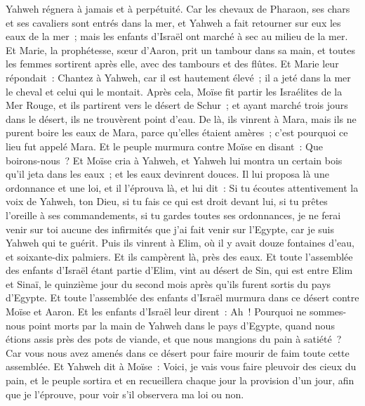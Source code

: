 \begin{multicols}{2}
Yahweh régnera à jamais et à perpétuité.
Car les chevaux de Pharaon, ses chars et ses cavaliers sont entrés dans la mer, et Yahweh a fait retourner sur eux les eaux de la mer~; mais les enfants d'Israël ont marché à sec au milieu de la mer.
Et Marie, la prophétesse, sœur d'Aaron, prit un tambour dans sa main, et toutes les femmes sortirent après elle, avec des tambours et des flûtes.
Et Marie leur répondait~: Chantez à Yahweh, car il est hautement élevé~; il a jeté dans la mer le cheval et celui qui le montait.
Après cela, Moïse fit partir les Israélites de la Mer Rouge, et ils partirent vers le désert de Schur~; et ayant marché trois jours dans le désert, ils ne trouvèrent point d'eau.
De là, ils vinrent à Mara, mais ils ne purent boire les eaux de Mara, parce qu'elles étaient amères~; c'est pourquoi ce lieu fut appelé Mara.
Et le peuple murmura contre Moïse en disant~: Que boirons-nous~?
Et Moïse cria à Yahweh, et Yahweh lui montra un certain bois qu'il jeta dans les eaux~; et les eaux devinrent douces. Il lui proposa là une ordonnance et une loi, et il l'éprouva là,
et lui dit~: Si tu écoutes attentivement la voix de Yahweh, ton Dieu, si tu fais ce qui est droit devant lui, si tu prêtes l'oreille à ses commandements, si tu gardes toutes ses ordonnances, je ne ferai venir sur toi aucune des infirmités que j'ai fait venir sur l'Egypte, car je suis Yahweh qui te guérit.
Puis ils vinrent à Elim, où il y avait douze fontaines d'eau, et soixante-dix palmiers. Et ils campèrent là, près des eaux.
\VerseOne{}Et toute l'assemblée des enfants d'Israël étant partie d'Elim, vint au désert de Sin, qui est entre Elim et Sinaï, le quinzième jour du second mois après qu'ils furent sortis du pays d'Egypte.
Et toute l'assemblée des enfants d'Israël murmura dans ce désert contre Moïse et Aaron.
Et les enfants d'Israël leur dirent~: Ah~! Pourquoi ne sommes-nous point morts par la main de Yahweh dans le pays d'Egypte, quand nous étions assis près des pots de viande, et que nous mangions du pain à satiété~? Car vous nous avez amenés dans ce désert pour faire mourir de faim toute cette assemblée.
Et Yahweh dit à Moïse~: Voici, je vais vous faire pleuvoir des cieux du pain, et le peuple sortira et en recueillera chaque jour la provision d'un jour, afin que je l'éprouve, pour voir s'il observera ma loi ou non.

\end{multicols}
